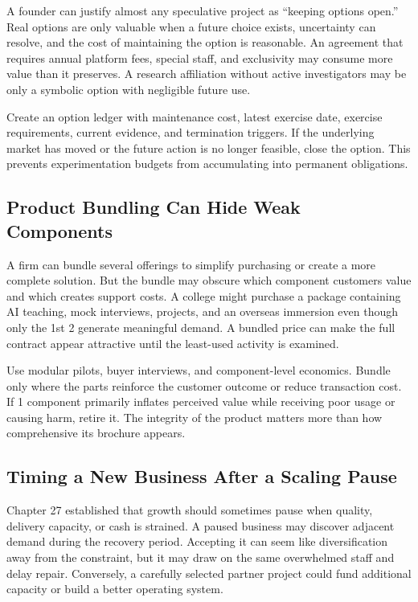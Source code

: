 A founder can justify almost any speculative project as ``keeping options open.'' Real options are only valuable when a future choice exists, uncertainty can resolve, and the cost of maintaining the option is reasonable. An agreement that requires annual platform fees, special staff, and exclusivity may consume more value than it preserves. A research affiliation without active investigators may be only a symbolic option with negligible future use.

Create an option ledger with maintenance cost, latest exercise date, exercise requirements, current evidence, and termination triggers. If the underlying market has moved or the future action is no longer feasible, close the option. This prevents experimentation budgets from accumulating into permanent obligations.

\subsection{Product Bundling Can Hide Weak Components}
\label{sec:product_bundling_hides_weak_components}

A firm can bundle several offerings to simplify purchasing or create a more complete solution. But the bundle may obscure which component customers value and which creates support costs. A college might purchase a package containing AI teaching, mock interviews, projects, and an overseas immersion even though only the 1st 2 generate meaningful demand. A bundled price can make the full contract appear attractive until the least-used activity is examined.

Use modular pilots, buyer interviews, and component-level economics. Bundle only where the parts reinforce the customer outcome or reduce transaction cost. If 1 component primarily inflates perceived value while receiving poor usage or causing harm, retire it. The integrity of the product matters more than how comprehensive its brochure appears.

\subsection{Timing a New Business After a Scaling Pause}
\label{sec:timing_new_business_after_scaling_pause}

Chapter 27 established that growth should sometimes pause when quality, delivery capacity, or cash is strained. A paused business may discover adjacent demand during the recovery period. Accepting it can seem like diversification away from the constraint, but it may draw on the same overwhelmed staff and delay repair. Conversely, a carefully selected partner project could fund additional capacity or build a better operating system.

